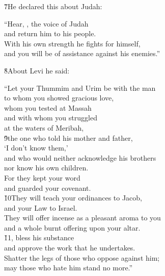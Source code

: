 \v{7}He declared this about Judah:

\begin{poetry}
\poeml ``Hear, , the voice of Judah \\
\poemll    and return him to his people. \\
\poeml With his own strength he fights for himself, \\
\poemll    and you will be of assistance against his enemies.''
\end{poetry}

\v{8}About Levi he said:

\begin{poetry}
\poeml ``Let your Thummim and Urim be with the man \\
\poemll    to whom you showed gracious love, \\
\poeml whom you tested at Massah \\
\poemll    and with whom you struggled \\
\poemlll       at the waters of Meribah, \\
\poeml \v{9}the one who told his mother and father, \\
\poemll    `I don't know them,' \\
\poeml and who would neither acknowledge his brothers \\
\poemll    nor know his own children. \\
\poeml For they kept your word \\
\poemll    and guarded your covenant. \\
\poeml \v{10}They will teach your ordinances to Jacob, \\
\poemll    and your Law to Israel. \\
\poeml They will offer incense as a pleasant aroma to you \\
\poemll    and a whole burnt offering upon your altar. \\
\poeml \v{11}, bless his substance \\
\poemll    and approve the work that he undertakes. \\
\poeml Shatter the legs of those who oppose against him; \\
\poemll    may those who hate him stand no more.''
\end{poetry}

